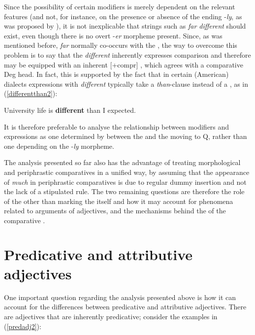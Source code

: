 Since the possibility of certain modifiers is merely dependent on the relevant  features (and not, for instance, on the presence or absence of the ending -\textit{ly}, as was proposed by \citealt{corver1997}), it is not inexplicable that strings such as \textit{far different} should exist, even though there is no overt -\textit{er} morpheme present. Since, as was mentioned before, \textit{far} normally co-occurs with the , the way to overcome this problem is to say that the  \textit{different} inherently expresses comparison and therefore may be equipped with an inherent [+compr] , which agrees with a comparative Deg head. In fact, this is supported by the fact that in certain (American) dialects  expressions with \textsl{different} typically take a \textit{than}-clause instead of a , as in (\ref{differentthan2}):

\ea	University life is \textbf{different} than I expected. \label{differentthan2}
\z

It is therefore preferable to analyse the relationship between  modifiers and  expressions as one determined by  between the  and the  moving to Q, rather than one depending on the -\textit{ly} morpheme.

The analysis presented so far also has the advantage of treating morphological and periphrastic comparatives in a unified way, by assuming that the appearance of \textit{much} in periphrastic comparatives is due to regular dummy insertion and not the lack of a stipulated  rule. The two remaining questions are therefore the role of the  other than marking the  itself and how it may account for phenomena related to  arguments of adjectives, and the mechanisms behind the  of the comparative .

\section{Predicative and attributive adjectives} \label{sec:2predicativeattributive}
One important question regarding the analysis presented above is how it can account for the differences between predicative and attributive adjectives. There are adjectives that are inherently predicative; consider the examples in (\ref{predadj2}):

\ea \label{predadj2}
 \label{afraid}
 \label{afraidgirl}
\z
\z

